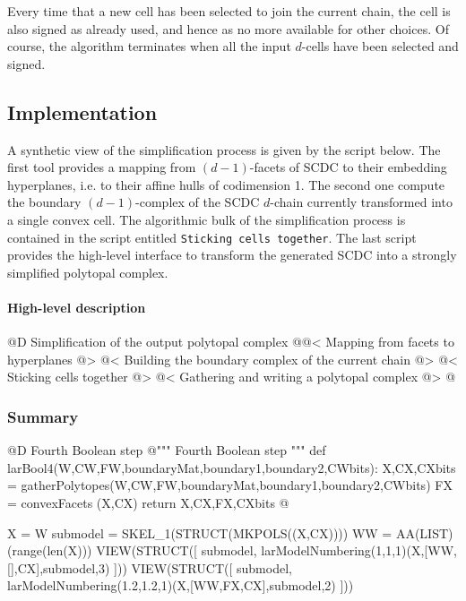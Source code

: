 \documentclass[11pt,oneside]{article}	%
\begin{document}
Every time that a new cell has been selected to join the current chain, the cell is also signed as already used, and hence as no more available for other choices. Of course, the algorithm terminates when all the input  $d$-cells have been selected and signed.


\subsection{Implementation}
A synthetic view of the simplification process is given by the script below.
The first tool provides a mapping from $(d-1)$-facets of SCDC to their embedding hyperplanes, i.e. to their affine hulls of codimension 1. The second one compute the boundary $(d-1)$-complex of the SCDC $d$-chain currently transformed into a single convex cell. The algorithmic bulk of the simplification process is contained in the script entitled \texttt{Sticking cells together}. The last script provides the high-level interface to transform the generated SCDC into a strongly simplified polytopal complex.

\paragraph{High-level description}

@D Simplification of the output polytopal complex
@{@< Mapping from facets to hyperplanes @>
@< Building the boundary complex of the current chain @>
@< Sticking cells together @>
@< Gathering and writing a polytopal complex @>
@}

\subsubsection{Summary}


@D Fourth Boolean step
@{""" Fourth Boolean step """
def larBool4(W,CW,FW,boundaryMat,boundary1,boundary2,CWbits):
	X,CX,CXbits = gatherPolytopes(W,CW,FW,boundaryMat,boundary1,boundary2,CWbits)
	FX = convexFacets (X,CX)
	return X,CX,FX,CXbits
@}

X = W
submodel = SKEL_1(STRUCT(MKPOLS((X,CX))))
WW = AA(LIST)(range(len(X)))
VIEW(STRUCT([ submodel, larModelNumbering(1,1,1)(X,[WW,[],CX],submodel,3) ]))
VIEW(STRUCT([ submodel, larModelNumbering(1.2,1.2,1)(X,[WW,FX,CX],submodel,2) ]))
\end{document}
